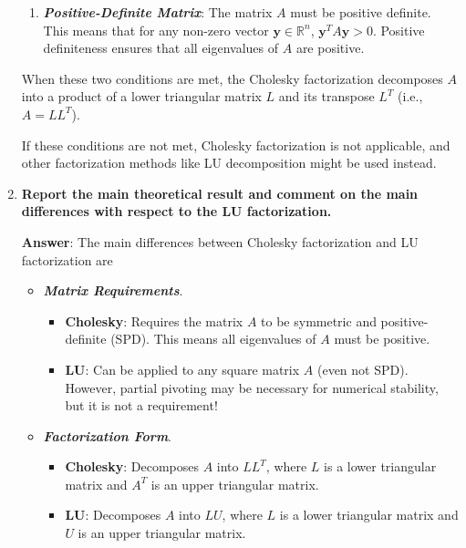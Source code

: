 \begin{enumerate}[label=\textcolor{Green3}{\textbf{\arabic*.}}]
\begin{enumerate}
        \item \textbf{\emph{Positive-Definite Matrix}}: The matrix $A$ must be positive definite. This means that for any non-zero vector $\mathbf{y} \in \mathbb{R}^n$, $\mathbf{y}^{T} A \mathbf{y} > 0$. Positive definiteness ensures that all eigenvalues of $A$ are positive.
    \end{enumerate}
    When these two conditions are met, the Cholesky factorization decomposes $A$ into a product of a lower triangular matrix $L$ and its transpose $L^{T}$ (i.e., $A = LL^{T}$).

    If these conditions are not met, Cholesky factorization is not applicable, and other factorization methods like LU decomposition might be used instead.


    \newpage

    \item \textcolor{Green3}{\textbf{%
        Report the main theoretical result and comment on the main diﬀerences with respect to the LU factorization.%
    }}

    \textbf{Answer}: The main differences between Cholesky factorization and LU factorization are
    \begin{itemize}
        \item \textbf{\emph{Matrix Requirements}}.
        \begin{itemize}
            \item \textbf{Cholesky}: Requires the matrix $A$ to be symmetric and positive-definite (SPD). This means all eigenvalues of $A$ must be positive.
            \item \textbf{LU}: Can be applied to any square matrix $A$ (even not SPD). However, partial pivoting may be necessary for numerical stability, but it is not a requirement!
        \end{itemize}

        \item \textbf{\emph{Factorization Form}}.
        \begin{itemize}
            \item \textbf{Cholesky}: Decomposes $A$ into $LL^{T}$, where $L$ is a lower triangular matrix and $A^{T}$ is an upper triangular matrix.
            \item \textbf{LU}: Decomposes $A$ into $LU$, where $L$ is a lower triangular matrix and $U$ is an upper triangular matrix.
        \end{itemize}


\end{itemize}
\end{enumerate}
